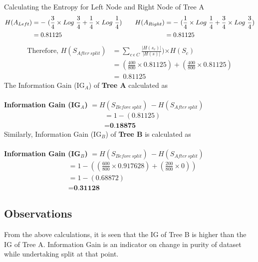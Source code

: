 \documentclass[a4paper,11pt]{article}
\newcommand\tab[1][1cm]{\hspace*{#1}}
\begin{document}
\begin{mlsolution}
\noindent
\tab Calculating the Entropy for  Left Node and Right Node of Tree A\\
\begin{equation*}
  \begin{split}
    H(A_{Left}) &=  -\ (\frac{3}{4} \times Log\ \frac{3}{4} + \frac{1}{4} \times Log\ \frac{1}{4} )\\
    &= 0.81125
  \end{split}
\quad\linebreak\quad
  \begin{split}
    H(A_{Right}) &=  -\ (\frac{1}{4} \times Log\ \frac{1}{4} + \frac{3}{4} \times Log\ \frac{3}{4} )\\
    &= 0.81125
  \end{split}
\end{equation*}
\begin{align*}
\text{Therefore,\ }H(S_{After\ split}) &= \sum\limits_{c\  \epsilon\  C}  \frac{|H(s_c)|}{|H(s)|}) {\times H(S_c)}\\
 &= (\frac{400}{800} \times 0.81125) + (\frac{400}{800} \times 0.81125) \\&=\ 0.81125
\end{align*}
\tab The Information Gain (IG$_A$) of \textbf{Tree A} calculated as\\
\\
\tab \textbf{Information Gain (IG$_A$)} $= H(S_{Before\ split})\ -H(S_{After\ split})$
\begin{align*}
  &=1-(0.81125)\\
  &= \textbf{0.18875}
\end{align*}
\noindent
\tab Similarly, Information Gain (IG$_B$) of \textbf{Tree B} is calculated as\\
\\
\tab \textbf{Information Gain (IG$_B$)} $= H(S_{Before\ split})\ -H(S_{After\ split})$
\begin{align*}
  &=1-((\frac{600}{800} \times 0.917628) + (\frac{200}{800} \times 0))\\   
  &=1-(0.68872)\\   
  &= \textbf{0.31128}
\end{align*}
\subsection*{Observations}
\tab From the above calculations, it is seen that the IG of Tree B is higher than the IG of Tree A.  Information Gain is an indicator on change in purity of dataset while undertaking split at that point. 

\end{mlsolution}
\end{document}

